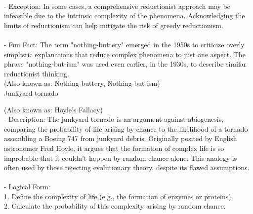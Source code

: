 \documentclass[a4paper,12pt,single,pdftex]{scrartcl}
\begin{document}
    
      
    \\

    
      - Exception: In some cases, a comprehensive reductionist approach may be infeasible due to the intrinsic complexity of the phenomena. Acknowledging the limits of reductionism can help mitigate the risk of greedy reductionism.
    \\

    
      
    \\

    
      - Fun Fact: The term "nothing-buttery" emerged in the 1950s to criticize overly simplistic explanations that reduce complex phenomena to just one aspect. The phrase "nothing-but-ism" was used even earlier, in the 1930s, to describe similar reductionist thinking.
    \\

  
    
      (Also known as: Nothing-buttery, Nothing-but-ism)
    \\

  

Junkyard tornado
    
      (Also known as: Hoyle's Fallacy)
    \\

  
    
      - Description: The junkyard tornado is an argument against abiogenesis, comparing the probability of life arising by chance to the likelihood of a tornado assembling a Boeing 747 from junkyard debris. Originally posited by English astronomer Fred Hoyle, it argues that the formation of complex life is so improbable that it couldn't happen by random chance alone. This analogy is often used by those rejecting evolutionary theory, despite its flawed assumptions.
    \\

    
      
    \\

    
      - Logical Form:
    \\

    
        1. Define the complexity of life (e.g., the formation of enzymes or proteins).
    \\

    
        2. Calculate the probability of this complexity arising by random chance.
    \\
\end{document}
